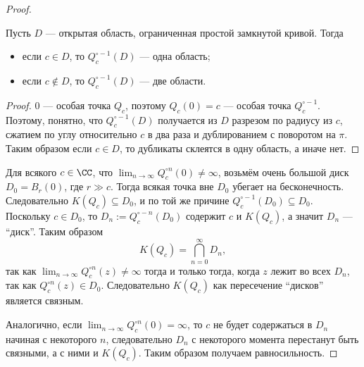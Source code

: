 \documentclass[12pt,a4paper]{article}
\begin{document}
    \begin{proof}
        \begin{thlemma}
            Пусть $D$ --- открытая область, ограниченная простой замкнутой кривой. Тогда
            \begin{itemize}
                \item если $c \in D$, то $Q_c^{\circ -1}(D)$ --- одна область;
                \item если $c \notin D$, то $Q_c^{\circ -1}(D)$ --- две области.
            \end{itemize}
        \end{thlemma}
    
        \begin{proof}
            $0$ --- особая точка $Q_c$, поэтому $Q_c(0) = c$ --- особая точка $Q_c^{\circ -1}$. Поэтому, понятно, что $Q_c^{\circ -1}(D)$ получается из $D$ разрезом по радиусу из $c$, сжатием по углу относительно $c$ в два раза и дублированием с поворотом на $\pi$. Таким образом если $c \in D$, то дубликаты склеятся в одну область, а иначе нет.
        \end{proof}

        Для всякого $c \in \CC$, что $\lim_{n \to \infty} Q_c^{\circ n}(0) \neq \infty$, возьмём очень большой диск $D_0 = B_r(0)$, где $r \gg c$. Тогда всякая точка вне $D_0$ убегает на бесконечность. Следовательно $K(Q_c) \subseteq D_0$, и по той же причине $Q_c^{\circ -1}(D_0) \subseteq D_0$. Поскольку $c \in D_0$, то $D_n := Q_c^{\circ -n}(D_0)$ содержит $c$ и $K(Q_c)$, а значит $D_n$ --- ``диск''. Таким образом
        \[K(Q_c) = \bigcap_{n=0}^\infty D_n,\]
        так как $\lim_{n \to \infty} Q_c^{\circ n}(z) \neq \infty$ тогда и только тогда, когда $z$ лежит во всех $D_n$, так как $Q_c^{\circ n}(z) \in D_0$. Следовательно $K(Q_c)$ как пересечение ``дисков'' является связным.
        
        Аналогично, если $\lim_{n \to \infty} Q_c^{\circ n}(0) = \infty$, то $c$ не будет содержаться в $D_n$ начиная с некоторого $n$, следовательно $D_n$ с некоторого момента перестанут быть связными, а с ними и $K(Q_c)$. Таким образом получаем равносильность.
    \end{proof}
\end{document}
